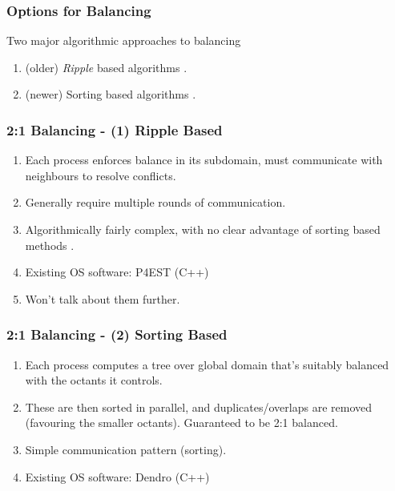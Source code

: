 \begin{frame}
\frametitle{Options for Balancing}
    Two major algorithmic approaches to balancing
    \begin{enumerate}
        \item (older) \textit{Ripple} based algorithms \cite{Isaac,Sundar2007}.
        \item (newer) Sorting based algorithms \cite{Malhotra2016,Lashuk2009}.
    \end{enumerate}
\end{frame}

\begin{frame}
    \frametitle{2:1 Balancing - (1) Ripple Based}
    \begin{enumerate}
        \item Each process enforces balance in its subdomain, must communicate with neighbours to resolve conflicts.
        \item Generally require multiple rounds of communication.
        \item Algorithmically fairly complex, with no clear advantage of sorting based methods \cite{Suh2020}.
        \item Existing OS software: P4EST (C++)
        \item Won't talk about them further.
    \end{enumerate}
\end{frame}

\begin{frame}
    \frametitle{2:1 Balancing - (2) Sorting Based}
    \begin{enumerate}
        \item Each process computes a tree over global domain that's suitably balanced with the octants it controls.
        \item These are then sorted in parallel, and duplicates/overlaps are removed (favouring the smaller octants). Guaranteed to be 2:1 balanced.
        \item Simple communication pattern (sorting).
        \item Existing OS software: Dendro (C++)
    \end{enumerate}
\end{frame}

